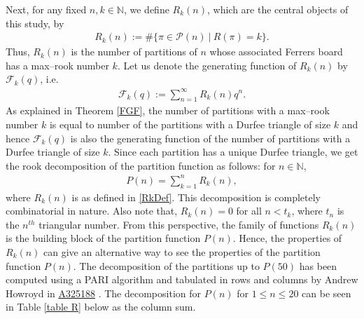 \documentclass[12pt,reqno]{amsart}
\numberwithin{equation}{section}
\theoremstyle{plain}
\newcommand{\seqnum}[1]{\href{https://oeis.org/#1}{\rm \underline{#1}}}
\begin{document}
Next, for any fixed $n, k \in \mathbb{N}$, we define $R_k(n)$, which are the central objects of this study, by
	\begin{align}
		R_k(n) := \# \bigg\{ \pi \in \mathscr{P}(n)\ \bigg|\ R(\pi)=k \bigg\}. \label{RkDef}
	\end{align}
	Thus, $R_k(n)$ is the number of partitions of $n$ whose associated Ferrers board has a max--rook number $k$. Let us denote the generating function of $R_k(n)$ by $\mathscr{F}_k(q)$, i.e.
	\begin{align}
		\mathscr{F}_k(q) := \sum_{n=1}^{\infty} R_k(n) q^n. \label{scrFkDef}
	\end{align} 
	As explained in Theorem \ref{FGF}, the number of partitions with a max--rook number $k$ is equal to number of the partitions with a Durfee triangle of size $k$ and hence $\mathscr{F}_k(q)$ is also the generating function of the number of partitions with a Durfee triangle of size $k$. Since each partition has a unique Durfee triangle, we get the rook decomposition of the partition function as follows: for $n \in \mathbb{N}$,
	\begin{align}
		P(n) = \sum_{k=1}^{n} R_k(n), \label{PR_j}
	\end{align} 
	where $R_k(n)$ is as defined in \eqref{RkDef}. This decomposition is completely combinatorial in nature. Also note that, $R_k(n)=0$ for all $n<t_k$, where $t_n$ is the $n^{th}$ triangular number. From this perspective, the family of functions $R_k(n)$ is the building block of the partition function $P(n)$. Hence, the properties of $R_k(n)$ can give an alternative way to see the properties of the partition function $P(n)$. The decomposition of the partitions up to $P(50)$ has been computed using a PARI algorithm and tabulated in rows and columns by Andrew Howroyd in \seqnum{A325188} \cite{oeis-2}. The decomposition for $P(n)$ for $1\leq n\leq 20$ can be seen in Table \ref{table R} below as the column sum.
	
\end{document}
